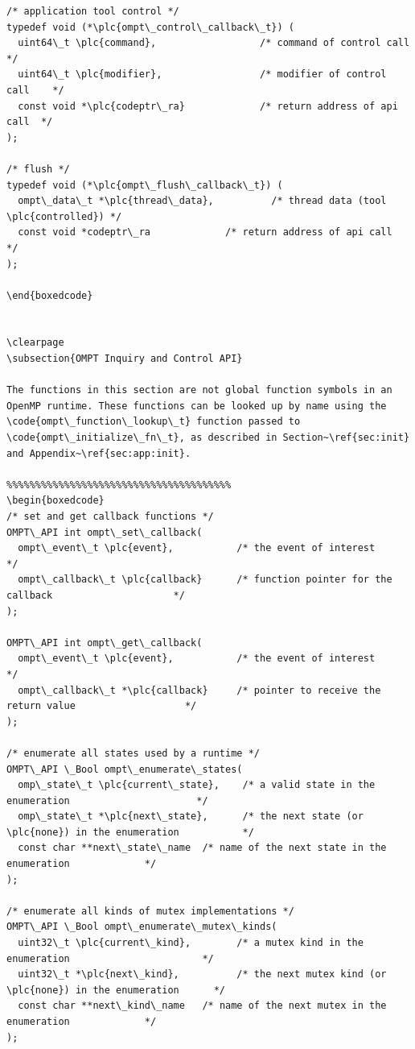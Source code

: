 \documentclass{article}
\begin{document}
\begin{boxedcode}
\begin{verbatim}
/* application tool control */
typedef void (*\plc{ompt\_control\_callback\_t}) (
  uint64\_t \plc{command},                  /* command of control call     */
  uint64\_t \plc{modifier},                 /* modifier of control call    */
  const void *\plc{codeptr\_ra}             /* return address of api call  */
);

/* flush */
typedef void (*\plc{ompt\_flush\_callback\_t}) (
  ompt\_data\_t *\plc{thread\_data},          /* thread data (tool \plc{controlled}) */
  const void *codeptr\_ra             /* return address of api call  */
);

\end{boxedcode}


\clearpage
\subsection{OMPT Inquiry and Control API}

The functions in this section are not global function symbols in an OpenMP runtime. These functions can be looked up by name using the \code{ompt\_function\_lookup\_t} function passed to \code{ompt\_initialize\_fn\_t}, as described in Section~\ref{sec:init} and Appendix~\ref{sec:app:init}.

%%%%%%%%%%%%%%%%%%%%%%%%%%%%%%%%%%%%%%%
\begin{boxedcode}
/* set and get callback functions */
OMPT\_API int ompt\_set\_callback( 
  ompt\_event\_t \plc{event},           /* the event of interest                                 */
  ompt\_callback\_t \plc{callback}      /* function pointer for the callback                     */
);

OMPT\_API int ompt\_get\_callback(
  ompt\_event\_t \plc{event},           /* the event of interest                                 */
  ompt\_callback\_t *\plc{callback}     /* pointer to receive the return value                   */
);

/* enumerate all states used by a runtime */
OMPT\_API \_Bool ompt\_enumerate\_states(
  omp\_state\_t \plc{current\_state},    /* a valid state in the enumeration                      */
  omp\_state\_t *\plc{next\_state},      /* the next state (or \plc{none}) in the enumeration           */
  const char **next\_state\_name  /* name of the next state in the enumeration             */
);

/* enumerate all kinds of mutex implementations */
OMPT\_API \_Bool ompt\_enumerate\_mutex\_kinds(
  uint32\_t \plc{current\_kind},        /* a mutex kind in the enumeration                       */
  uint32\_t *\plc{next\_kind},          /* the next mutex kind (or \plc{none}) in the enumeration      */
  const char **next\_kind\_name   /* name of the next mutex in the enumeration             */
);


\end{verbatim}
\end{boxedcode}
\end{document}
